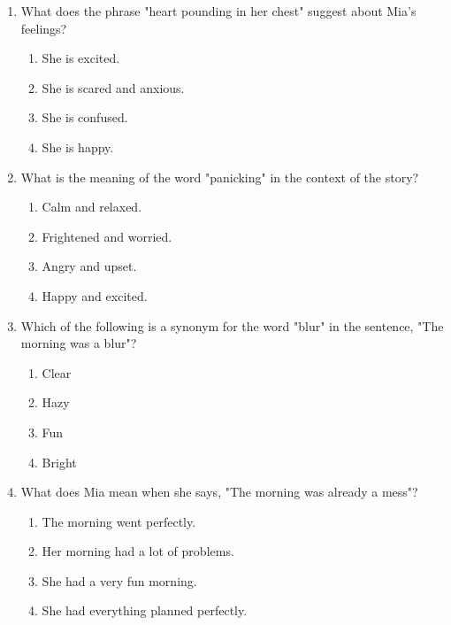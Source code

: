\documentclass[12pt]{article}
\begin{document}
\begin{enumerate}

    \item What does the phrase "heart pounding in her chest" suggest about Mia’s feelings?
    \begin{enumerate}[label=\Alph*.]
        \item She is excited.
        \item She is scared and anxious.
        \item She is confused.
        \item She is happy.
    \end{enumerate}
    \vspace{0.5cm}

    \item What is the meaning of the word "panicking" in the context of the story?
    \begin{enumerate}[label=\Alph*.]
        \item Calm and relaxed.
        \item Frightened and worried.
        \item Angry and upset.
        \item Happy and excited.
    \end{enumerate}
    \vspace{0.5cm}

    \item Which of the following is a synonym for the word "blur" in the sentence, "The morning was a blur"?
    \begin{enumerate}[label=\Alph*.]
        \item Clear
        \item Hazy
        \item Fun
        \item Bright
    \end{enumerate}
    \vspace{0.5cm}

    \item What does Mia mean when she says, "The morning was already a mess"?
    \begin{enumerate}[label=\Alph*.]
        \item The morning went perfectly.
        \item Her morning had a lot of problems.
        \item She had a very fun morning.
        \item She had everything planned perfectly.
    \end{enumerate}
    \vspace{0.5cm}


\end{enumerate}
\end{document}
